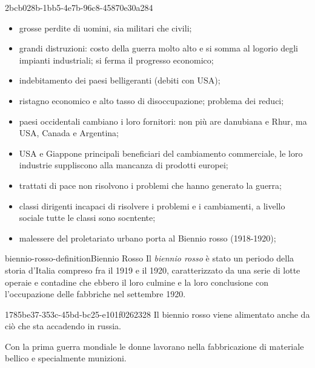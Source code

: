 \documentclass[preview]{standalone}
\begin{document}
\begin{snippet}{2bcb028b-1bb5-4e7b-96c8-45870e30a284}
    \begin{itemize}
        \item grosse perdite di uomini, sia militari che civili;
        \item grandi distruzioni: costo della guerra molto alto e si somma al logorio
            degli impianti industriali; si ferma il progresso economico;
        \item indebitamento dei paesi belligeranti (debiti con USA);
        \item ristagno economico e alto tasso di disoccupazione; problema dei reduci;
        \item paesi occidentali cambiano i loro fornitori: non più are danubiana
            e Rhur, ma USA, Canada e Argentina;
        \item USA e Giappone principali beneficiari del cambiamento
            commerciale, le loro industrie suppliscono alla mancanza di prodotti europei;
        \item trattati di pace non risolvono i problemi che hanno generato la guerra;
        \item classi dirigenti incapaci di risolvere i problemi e i cambiamenti,
            a livello sociale tutte le classi sono socntente;
        \item malessere del proletariato urbano porta al Biennio rosso (1918-1920);
    \end{itemize}
\end{snippet}

\begin{snippetdefinition}{biennio-rosso-definition}{Biennio Rosso}
    Il \textit{biennio rosso} 
    è stato un periodo
    della storia d'Italia compreso fra il
    1919 e il 1920, caratterizzato da una serie
    di lotte operaie e contadine che ebbero il
    loro culmine e la loro conclusione con
    l'occupazione delle fabbriche nel settembre 1920.
\end{snippetdefinition}

\begin{snippet}{1785be37-353c-45bd-bc25-e101f0262328}
    Il biennio rosso viene alimentato anche da ciò che sta accadendo in russia.

    Con la prima guerra mondiale le donne lavorano nella fabbricazione di materiale bellico e 
    specialmente munizioni.
\end{snippet}
\end{document}
